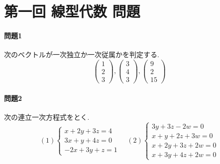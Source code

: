 \documentclass[a4j,dvipdfmx]{jsarticle}
\begin{document}
    \part*{第一回 線型代数 問題}
    \subsection*{問題1}
        次のベクトルが一次独立か一次従属かを判定する.
        \begin{equation*}
            \begin{pmatrix}1 \\ 2 \\ 3 \end{pmatrix}, \begin{pmatrix}3 \\ 4 \\ 3 \end{pmatrix}, \begin{pmatrix}9 \\ 2 \\ 15 \end{pmatrix}
        \end{equation*}
    \subsection*{問題2}
        次の連立一次方程式をとく.
        \begin{equation*}
            (1)\left\{\begin{array}{c}
                x+2y+3z=4\\
                3x+y+4z=0\\
                -2x+3y+z=1
            \end{array}\right.\quad 
            (2)\left\{\begin{array}{c}
                3y+3z-2w=0\\
                x+y+2z+3w=0\\
                x+2y+3z+2w=0\\
                x+3y+4z+2w=0
            \end{array}\right.
        \end{equation*}
\end{document}
